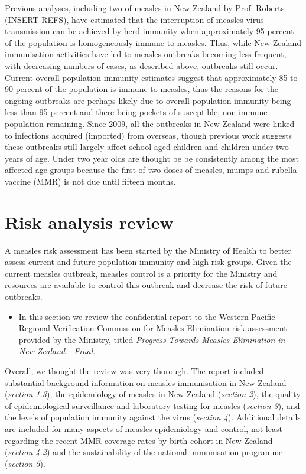 \documentclass{article}
\begin{document}
Previous analyses, including two of measles in New Zealand by Prof. Roberts (INSERT REFS), have estimated that the interruption of measles virus transmission can be achieved by herd immunity when approximately 95 percent of the population is homogeneously immune to measles. Thus, while New Zealand immunisation activities have led to measles outbreaks becoming less frequent, with decreasing numbers of cases, as described above, outbreaks still occur. Current overall population immunity estimates suggest that approximately 85 to 90 percent of the population is immune to measles, thus the reasons for the ongoing outbreaks are perhaps likely due to overall population immunity being less than 95 percent and there being pockets of susceptible, non-immune population remaining. Since 2009, all the outbreaks in New Zealand were linked to infections acquired (imported) from overseas, though previous work suggests these outbreaks still largely affect school-aged children and children under two years of age. Under two year olds are thought be be consistently among the most affected age groups because the first of two doses of measles, mumps and rubella vaccine (MMR) is not due until fifteen months.

\section{Risk analysis review}

A measles risk assessment has been started by the Ministry of Health to better assess current and future population immunity and high risk groups. Given the current measles outbreak, measles control is a priority for the Ministry and resources are available to control this outbreak and decrease the risk of future outbreaks.
\begin{itemize}
\item In this section we review the confidential report to the Western Pacific Regional Verification Commission for Measles Elimination risk assessment provided by the Ministry, titled \emph {Progress Towards Measles Elimination in New Zealand - Final}.
\end{itemize}

Overall, we thought the review was very thorough. The report included substantial background information on measles immunisation in New Zealand (\emph{section 1.3}), the epidemiology of measles in New Zealand (\emph{section 2}), the quality of epidemiological surveillance and laboratory testing for measles (\emph{section 3}), and the levels of population immunity against the virus (\emph{section 4}). Additional details are included for many aspects of measles epidemiology and control, not least regarding the recent MMR coverage rates by birth cohort in New Zealand (\emph{section 4.2}) and the sustainability of the national immunisation programme (\emph{section 5}).
\end{document}
